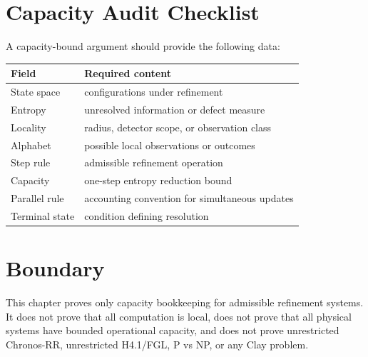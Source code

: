 \section{Capacity Audit Checklist}

A capacity-bound argument should provide the following data:

\begin{center}
\begin{tabular}{ll}
\toprule
Field & Required content \\
\midrule
State space & configurations under refinement \\
Entropy & unresolved information or defect measure \\
Locality & radius, detector scope, or observation class \\
Alphabet & possible local observations or outcomes \\
Step rule & admissible refinement operation \\
Capacity & one-step entropy reduction bound \\
Parallel rule & accounting convention for simultaneous updates \\
Terminal state & condition defining resolution \\
\bottomrule
\end{tabular}
\end{center}

\section{Boundary}

This chapter proves only capacity bookkeeping for admissible refinement
systems. It does not prove that all computation is local, does not prove that
all physical systems have bounded operational capacity, and does not prove
unrestricted Chronos-RR, unrestricted H4.1/FGL, P vs NP, or any Clay problem.

